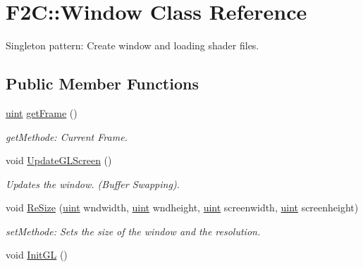 \hypertarget{class_f2_c_1_1_window}{
\section{F2C::Window Class Reference}
\label{class_f2_c_1_1_window}
}


Singleton pattern: Create window and loading shader files.  
\subsection*{Public Member Functions}
\begin{DoxyCompactItemize}
\item 
\hypertarget{class_f2_c_1_1_window_a54df9471759b05ade2b6331bcbc01d2e}{
\hyperlink{namespace_f2_c_a58be2bac9eb3e3c99cb41b6008bf4fae}{uint} \hyperlink{class_f2_c_1_1_window_a54df9471759b05ade2b6331bcbc01d2e}{getFrame} ()}
\label{class_f2_c_1_1_window_a54df9471759b05ade2b6331bcbc01d2e}

\begin{DoxyCompactList}\small\item\em getMethode: Current Frame. \item\end{DoxyCompactList}\item 
\hypertarget{class_f2_c_1_1_window_a7c5e369664f3268c5d284c8d6991f8a1}{
void \hyperlink{class_f2_c_1_1_window_a7c5e369664f3268c5d284c8d6991f8a1}{UpdateGLScreen} ()}
\label{class_f2_c_1_1_window_a7c5e369664f3268c5d284c8d6991f8a1}

\begin{DoxyCompactList}\small\item\em Updates the window. (Buffer Swapping). \item\end{DoxyCompactList}\item 
void \hyperlink{class_f2_c_1_1_window_a018c40b68699cc3202cb6e29b2c22747}{ReSize} (\hyperlink{namespace_f2_c_a58be2bac9eb3e3c99cb41b6008bf4fae}{uint} wndwidth, \hyperlink{namespace_f2_c_a58be2bac9eb3e3c99cb41b6008bf4fae}{uint} wndheight, \hyperlink{namespace_f2_c_a58be2bac9eb3e3c99cb41b6008bf4fae}{uint} screenwidth, \hyperlink{namespace_f2_c_a58be2bac9eb3e3c99cb41b6008bf4fae}{uint} screenheight)
\begin{DoxyCompactList}\small\item\em setMethode: Sets the size of the window and the resolution. \item\end{DoxyCompactList}\item 
\hypertarget{class_f2_c_1_1_window_ab3c3289418b453e215486ed6fb611f5a}{
void \hyperlink{class_f2_c_1_1_window_ab3c3289418b453e215486ed6fb611f5a}{InitGL} ()}
\label{class_f2_c_1_1_window_ab3c3289418b453e215486ed6fb611f5a}


\end{DoxyCompactItemize}
